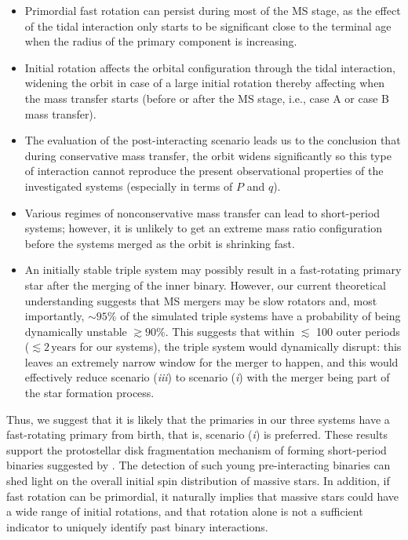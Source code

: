 \documentclass{aa}
\begin{document}
\begin{itemize}
  \item Primordial fast rotation can persist during most of the MS stage, as the effect of the tidal interaction only starts to be significant close to the terminal age when the radius of the primary component is increasing.
  \item Initial rotation affects the orbital configuration through the tidal interaction, widening the orbit in case of a large initial rotation thereby affecting when the mass transfer starts (before or after the MS stage, i.e., case A or case B mass transfer).
  \item The evaluation of the post-interacting scenario leads us to the conclusion that during conservative mass transfer, the orbit widens significantly so this type of interaction cannot reproduce the present observational properties of the investigated systems (especially in terms of $P$ and $q$).
  \item Various regimes of nonconservative mass transfer can lead to
    short-period systems; however, it is unlikely to get an extreme mass ratio configuration before the systems merged as the orbit is shrinking fast.
  \item An initially stable triple system may possibly result in a
    fast-rotating primary star after the merging of the inner binary.
    However, our current theoretical understanding suggests
      that MS mergers may be slow rotators and, most
      importantly, $\sim95\%$ of the simulated triple systems have a probability of being
      dynamically unstable $\gtrsim 90\%$. This suggests that within
      $\lesssim$ 100 outer periods ($\lesssim 2\,\mathrm{years}$ for
      our systems), the triple system would dynamically disrupt: this leaves
      an extremely narrow window for the merger to happen, and this would
      effectively reduce scenario (\emph{iii}) to scenario (\emph{i}) with the merger
      being part of the star formation process. %
\end{itemize}

Thus, we suggest that it is likely that the primaries in our three
systems have a fast-rotating primary from birth, that is, scenario (\emph{i})
is preferred. These results support the protostellar disk fragmentation mechanism of forming short-period binaries suggested by \citet{Tokovinin_2020}.
The detection of such young pre-interacting binaries can shed light on the overall initial spin distribution of massive stars.
In addition, if fast rotation can be primordial, it naturally implies that massive
stars could have a wide range of initial rotations, and that rotation
alone is not a sufficient indicator to uniquely identify past binary interactions.
\end{document}
